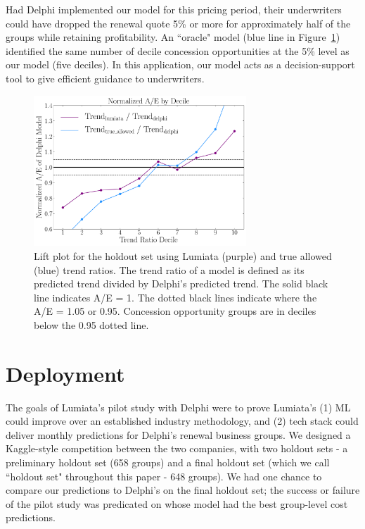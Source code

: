 \documentclass[letterpaper]{article} %
\begin{document}
Had Delphi implemented our model for this pricing period, their underwriters could have dropped the renewal quote 5\% or more for approximately half of the groups while retaining profitability. An ``oracle" model (blue line in Figure~\ref{fig:lift}) identified the same number of decile concession opportunities at the 5\% level as our model (five deciles). In this application, our model acts as a decision-support tool to give efficient guidance to underwriters.
\begin{figure}\begin{center}
  \includegraphics[width=80mm]{final-lift-plot.pdf}
  \caption{Lift plot for the holdout set using Lumiata (purple) and true allowed (blue) trend ratios. The trend ratio of a model is defined as its predicted trend divided by Delphi's predicted trend. The solid black line indicates A/E = 1.  The dotted black lines indicate where the A/E = 1.05 or 0.95.  Concession opportunity groups are in deciles below the 0.95 dotted line.}
  \label{fig:lift}
  \end{center}
\end{figure}

\section*{Deployment}\label{sec:deployment}
The goals of Lumiata's pilot study with Delphi were to prove Lumiata's (1) ML could improve over an established industry methodology, and (2) tech stack could deliver monthly predictions for Delphi's renewal business groups. We designed a Kaggle-style competition between the two companies, with two holdout sets - a preliminary holdout set (658 groups) and a final holdout set (which we call ``holdout set" throughout this paper - 648 groups). We had one chance to compare our predictions to Delphi's on the final holdout set; the success or failure of the pilot study was predicated on whose model had the best group-level cost predictions.  
\end{document}
